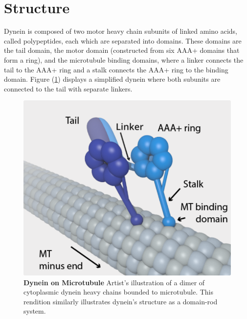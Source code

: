 \section{Structure}

Dynein is composed of two motor heavy chain subunits of linked amino acids, called polypeptides, each which are separated into domains. These domains are the tail domain, the motor domain (constructed from six AAA+ domains that form a ring), and the microtubule binding domains, where a linker connects the tail to the AAA+ ring and a stalk connects the AAA+ ring to the binding domain. Figure (\ref{fig:structure}) displays a simplified dynein where both subunits are connected to the tail with separate linkers. 


\begin{figure}[H]
	\centering
	\includegraphics[width=0.6\columnwidth]{Figures/dynein_on_MT.png}
	\caption[Dynein on Microtubule]{\textbf{Dynein on Microtubule} Artist’s illustration of a dimer of cytoplasmic dynein heavy chains bounded to microtubule. This rendition similarly illustrates dynein’s structure as a domain-rod system. \cite{TheTrappistArt}}
	\label{fig:structure}
\end{figure}


